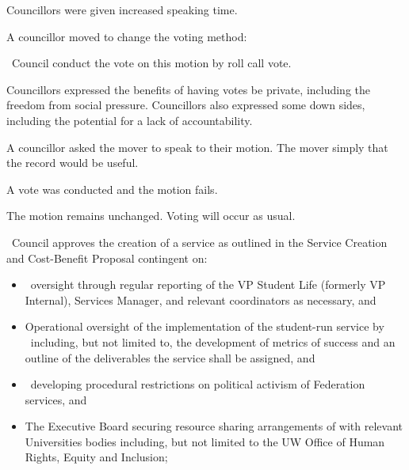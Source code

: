\begin{motion}
    Councillors were given increased speaking time.

    A councillor moved to change the voting method:

    \begin{motion}
        \birt\ Council conduct the vote on this motion by roll call vote.
        \movers{\harsh}{\nickta}

        Councillors expressed the benefits of having votes be private,
        including the freedom from social pressure. Councillors also expressed
        some down sides, including the potential for a lack of accountability.

        A councillor asked the mover to speak to their motion. The mover simply
        that the record would be useful.

        A vote was conducted and the motion fails.
    \end{motion}

    The motion remains unchanged. Voting will occur as usual.

    \begin{motion}
        \birt\ Council approves the creation of a service as outlined in the
        Service Creation and Cost-Benefit Proposal contingent on:

        \begin{itemize}
            \item \clac\ oversight through regular reporting of the VP Student
                Life (formerly VP Internal), Services Manager, and relevant
                coordinators as necessary, and 

            \item Operational oversight of the implementation of the
                student-run service by \clac\ including, but not limited to,
                the development of metrics of success and an outline of the
                deliverables the service shall be assigned, and

            \item \clac\ developing procedural restrictions on political
                activism of Federation services, and

            \item The Executive Board securing resource sharing
                arrangements of with relevant Universities bodies
                including, but not limited to the UW Office of Human
                Rights, Equity and Inclusion;
        \end{itemize}
        \movers{\seneca}{\alexander}


\end{motion}
\end{motion}
